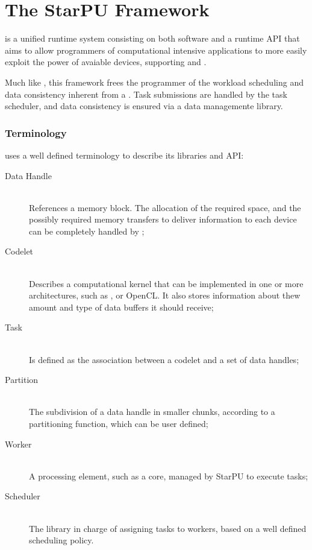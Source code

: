 \documentclass[main.tex]{subfiles}
\begin{document}
\chapter{The StarPU Framework} \label{chapter:starpu}

\starpu \cite{augonnet2011starpu} is a unified runtime system consisting on both software and a runtime API that aims to allow programmers of computational intensive applications to more easily exploit the power of avaiable devices, supporting \cpus and \gpus.

Much like \gama, this framework frees the programmer of the workload scheduling and data consistency inherent from a \hetplat. Task submissions are handled by the \starpu task scheduler, and data consistency is ensured via a data managemente library.

\subsection{Terminology}

\starpu uses a well defined terminology to describe its libraries and API:

\begin{description}
  \item[Data Handle] \hfill \\
    References a memory block. The allocation of the required space, and the possibly required memory transfers to deliver information to each device can be completely handled by \starpu;

  \item[Codelet] \hfill \\
    Describes a computational kernel that can be implemented in one or more architectures, such as \cpus, \cuda or \acs{OpenCL}. It also stores information about thew amount and type of data buffers it should receive;

  \item[Task] \hfill \\
    Is defined as the association between a codelet and a set of data handles;

  \item[Partition] \hfill \\
    The subdivision of a data handle in smaller chunks, according to a partitioning function, which can be user defined;

  \item[Worker] \hfill \\
    A processing element, such as a \cpu core, managed by StarPU to execute tasks;

  \item[Scheduler] \hfill \\
    The library in charge of assigning tasks to workers, based on a well defined scheduling policy.

\end{description}
\end{document}
